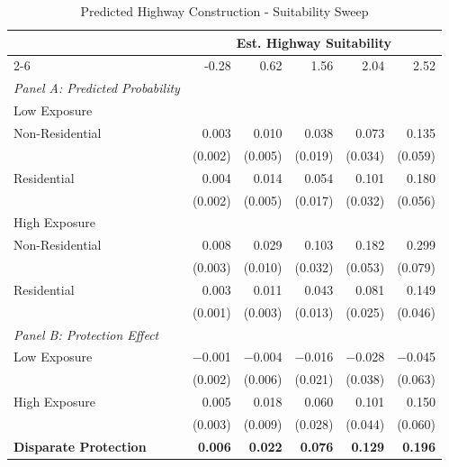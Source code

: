 \begin{table}[h]
\centering
\caption{Predicted Highway Construction - Suitability Sweep}
\label{tab:predicted_outcomes/black_share_indicator_sweep}
\begin{threeparttable}
\begin{tabular*}{1\textwidth}{@{\extracolsep{\fill}}lr@{\hspace{1.2em}}r@{\hspace{1.2em}}r@{\hspace{1.2em}}r@{\hspace{1.2em}}r@{\hspace{1.2em}}}
\toprule
 & \multicolumn{5}{c}{Est. Highway Suitability} \\
\cmidrule(l){2-6}
 & -0.28 & 0.62 & 1.56 & 2.04 & 2.52 \\
\midrule
\textit{Panel A: Predicted Probability} & & & & & \\
\addlinespace[2pt]
Low Exposure & & & & & \\
\quad Non-Residential & 0.003 & 0.010 & 0.038 & 0.073 & 0.135 \\
 & (0.002) & (0.005) & (0.019) & (0.034) & (0.059) \\[4pt]
\quad Residential & 0.004 & 0.014 & 0.054 & 0.101 & 0.180 \\
 & (0.002) & (0.005) & (0.017) & (0.032) & (0.056) \\[4pt]
High Exposure & & & & & \\
\quad Non-Residential & 0.008 & 0.029 & 0.103 & 0.182 & 0.299 \\
 & (0.003) & (0.010) & (0.032) & (0.053) & (0.079) \\[4pt]
\quad Residential & 0.003 & 0.011 & 0.043 & 0.081 & 0.149 \\
 & (0.001) & (0.003) & (0.013) & (0.025) & (0.046) \\[4pt]
\midrule
\textit{Panel B: Protection Effect} & & & & & \\
\addlinespace[2pt]
Low Exposure & $-$0.001 & $-$0.004 & $-$0.016 & $-$0.028 & $-$0.045 \\
 & (0.002) & (0.006) & (0.021) & (0.038) & (0.063) \\[4pt]
High Exposure & 0.005\rlap{$^{*}$} & 0.018\rlap{$^{**}$} & 0.060\rlap{$^{**}$} & 0.101\rlap{$^{**}$} & 0.150\rlap{$^{**}$} \\
 & (0.003) & (0.009) & (0.028) & (0.044) & (0.060) \\[4pt]
\addlinespace[2pt]
\textbf{Disparate Protection} & \textbf{0.006}\rlap{$^{***}$} & \textbf{0.022}\rlap{$^{***}$} & \textbf{0.076}\rlap{$^{***}$} & \textbf{0.129}\rlap{$^{***}$} & \textbf{0.196}\rlap{$^{***}$} \\

\end{tabular*}
\end{threeparttable}
\end{table}
